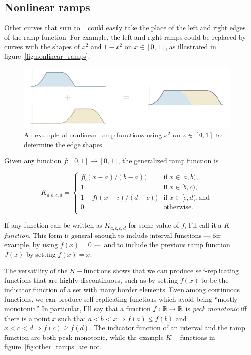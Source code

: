\documentclass[20pt,]{extarticle}
\begin{document}
\subsection{Nonlinear ramps}\label{sec:nonlinearux5framps}

Other curves that sum to 1 could easily take the place of the left and
right edges of the ramp function. For example, the left and right ramps
could be replaced by curves with the shapes of \(x^2\) and \(1-x^2\) on
\(x\in [0, 1]\), as illustrated in figure~\ref{fig:nonlinear_ramps}.

\begin{figure}[htbp]
\centering
\includegraphics{images/nonlinear_ramps2.png}
\caption{\label{fig:nonlinear_ramps}An example of nonlinear ramp
functions using \(x^2\) on \(x\in [0, 1]\) to determine the edge
shapes.}\label{fig:nonlinearux5framps}
\end{figure}

Given any function \(f:[0,1]\to [0,1]\), the generalized ramp function
is

\[ K_{a,b,c,d} = \begin{cases}
f\big((x - a) / (b - a)\big) & \text{if } x \in [a, b), \\
1 & \text{if } x \in [b, c), \\
1 - f\big((x - c) / (d - c)\big) & \text{if } x \in [c, d), \text{and} \\
0 & \text{otherwise.} \\
\end{cases}\]

If any function can be written as \(K_{a,b,c,d}\) for some value of
\(f\), I'll call it a \(K-\)\emph{function}. This form is general enough
to include interval functions --- for example, by using \(f(x) = 0\)
---~and to include the previous ramp function \(J(x)\) by setting
\(f(x)=x\).

The versatility of the \(K-\)functions shows that we can produce
self-replicating functions that are highly discontinuous, such as by
setting \(f(x)\) to be the indicator function of a set with many border
elements. Even among continuous functions, we can produce
self-replicating functions which avoid being ``mostly monotonic.'' In
particular, I'll say that a function \(f:\mathbb{R}\to\mathbb{R}\) is \emph{peak
monotonic} iff there is a point \(x\) such that
\(a < b < x \Rightarrow f(a) \le f(b)\) and
\(x < c < d \Rightarrow f(c) \ge f(d)\). The indicator function of an
interval and the ramp function are both peak monotonic, while the
example \(K-\)functions in figure~\ref{fig:other_ramps} are not.
\end{document}
